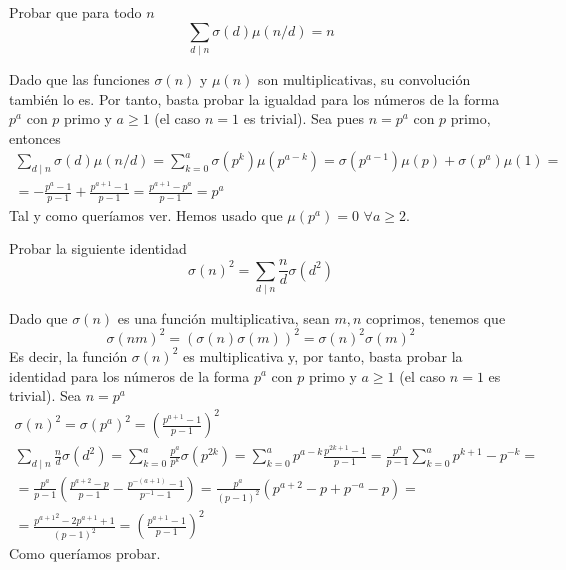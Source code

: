 \documentclass[twoside]{article}
\begin{document}
\begin{ejercicio}{3}
Probar que para todo $n$
\[
\sum_{d\mid n} \sigma(d)\mu(n/d)=n 
\]
\begin{sol}
Dado que las funciones $\sigma(n)$ y $\mu(n)$ son multiplicativas, su convolución también lo es. Por tanto, basta probar la igualdad para los números de la forma $p^a$ con $p$ primo y $a\geq 1$ (el caso $n=1$ es trivial). Sea pues $n=p^a$ con $p$ primo, entonces
\begin{gather*}
\sum_{d\mid n} \sigma(d)\mu(n/d) = \sum_{k=0}^a \sigma(p^k)\mu(p^{a-k}) = \sigma(p^{a-1})\mu(p) + \sigma(p^a)\mu(1) = \\
=  -\frac{p^a - 1}{p-1} +\frac{p^{a+1}-1}{p-1} = \frac{p^{a+1}-p^a}{p-1} = p^a
\end{gather*}
Tal y como queríamos ver. Hemos usado que $\mu(p^a)=0$ $\forall a \geq 2$.
\end{sol}
\end{ejercicio}


\newpage


\begin{ejercicio}{11}
Probar la siguiente identidad	
\[
\sigma(n)^2 = \sum_{d\mid n} \frac{n}{d}\sigma(d^2) 
\]
\begin{sol}
Dado que $\sigma(n)$ es una función multiplicativa, sean $m,n$ coprimos, tenemos que
\[
\sigma(nm)^2 = (\sigma(n)\sigma(m))^2 = \sigma(n)^2\sigma(m)^2
\]
Es decir, la función $\sigma(n)^2$ es multiplicativa y, por tanto, basta probar la identidad para los números de la forma $p^a$ con $p$ primo y $a\geq 1$ (el caso $n=1$ es trivial). Sea $n=p^a$
\begin{gather*}
\sigma(n)^2 = \sigma(p^a)^2 = \left(\frac{p^{a+1}-1}{p-1}\right)^2\\  \sum_{d\mid n} \frac{n}{d}\sigma(d^2) = \sum_{k=0}^a \frac{p^a}{p^k}\sigma(p^{2k})= \sum_{k=0}^a p^{a-k}\frac{p^{2k+1}-1}{p-1} = \frac{p^a}{p-1} \sum_{k=0}^a p^{k+1}- p^{-k} = \\
 = \frac{p^a}{p-1} \left(\frac{p^{a+2}-p}{p-1}-\frac{p^{-(a+1)}-1}{p^{-1}-1}\right) = \frac{p^a}{(p-1)^2}(p^{a+2}-p+ p^{-a}-p) = \\
 = \frac{{p^{a+1}}^2-2p^{a+1}+1}{(p-1)^2} =  \left(\frac{p^{a+1}-1}{p-1}\right)^2
\end{gather*}
Como queríamos probar.
\end{sol}
\end{ejercicio}
\end{document}
